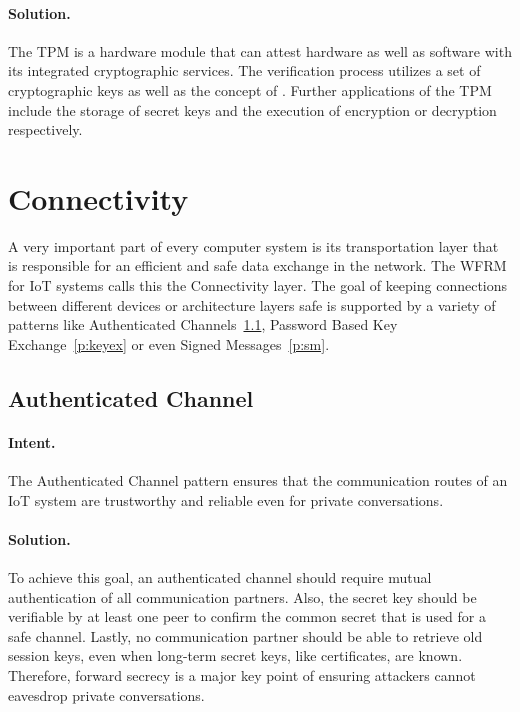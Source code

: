 \paragraph{\textbf{Solution.}} The TPM is a hardware module that can attest hardware as well as software with its integrated cryptographic services. The verification process utilizes a set of cryptographic keys as well as the concept of . Further applications of the TPM include the storage of secret keys and the execution of encryption or decryption respectively.


\section{Connectivity}\label{L2}
A very important part of every computer system is its transportation layer that is responsible for an efficient and safe data exchange in the network. The WFRM for IoT systems calls this the Connectivity layer. The goal of keeping connections between different devices or architecture layers safe is supported by a variety of patterns like Authenticated Channels~\ref{p:ac}, Password Based Key Exchange~\ref{p:keyex} or even Signed Messages~\ref{p:sm}.

\subsection{Authenticated Channel~\cite{Papoutsakis2021}} 
\label{p:ac}

\paragraph{\textbf{Intent.}} The Authenticated Channel pattern ensures that the communication routes of an IoT system are trustworthy and reliable even for private conversations.

\paragraph{\textbf{Solution.}} To achieve this goal, an authenticated channel should require mutual authentication of all communication partners. Also, the secret key should be verifiable by at least one peer to confirm the common secret that is used for a safe channel. Lastly, no communication partner should be able to retrieve old session keys, even when long-term secret keys, like certificates, are known. Therefore, forward secrecy is a major key point of ensuring attackers cannot eavesdrop private conversations.


